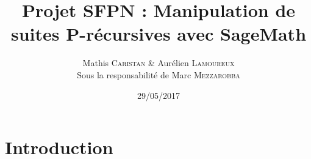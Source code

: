 \documentclass{beamer}
\title[Suites P-récursives]{Projet SFPN : Manipulation de suites P-récursives avec SageMath}
\author[M. Caristan \& A. Lamoureux]{Mathis \textsc{Caristan} \& Aurélien \textsc{Lamoureux}\\
{\scriptsize Sous la responsabilité de Marc \textsc{Mezzarobba}}}
\institute[UPMC]{Université Pierre \& Marie Curie}
\date{29/05/2017}
\begin{document}
\begin{frame}
\titlepage %
\end{frame}

\begin{frame}
\tableofcontents %
\end{frame}

\section{Introduction}%
\end{document}
